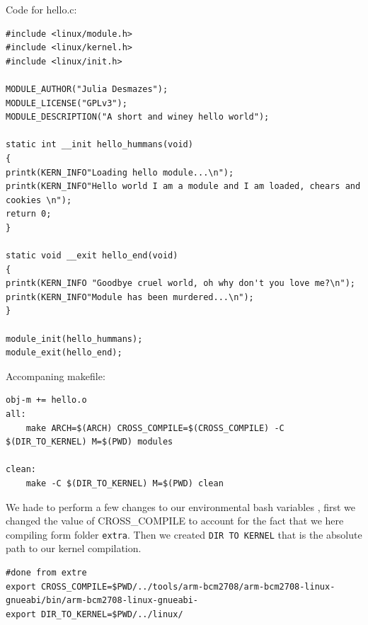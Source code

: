 \documentclass[a4paper,oneside,onecolumn]{article}
\newcommand{\code}[1]{\colorbox{codegray}{\texttt{#1}}}
\begin{document}
Code for hello.c:
\begin{lstlisting}
#include <linux/module.h>       
#include <linux/kernel.h>  
#include <linux/init.h>   

MODULE_AUTHOR("Julia Desmazes");
MODULE_LICENSE("GPLv3");
MODULE_DESCRIPTION("A short and winey hello world");

static int __init hello_hummans(void)
{
printk(KERN_INFO"Loading hello module...\n");
printk(KERN_INFO"Hello world I am a module and I am loaded, chears and cookies \n");
return 0;
}

static void __exit hello_end(void)
{
printk(KERN_INFO "Goodbye cruel world, oh why don't you love me?\n");
printk(KERN_INFO"Module has been murdered...\n");
}

module_init(hello_hummans);
module_exit(hello_end);
\end{lstlisting}
Accompaning makefile:
\begin{lstlisting}
obj-m += hello.o
all:
	make ARCH=$(ARCH) CROSS_COMPILE=$(CROSS_COMPILE) -C $(DIR_TO_KERNEL) M=$(PWD) modules

clean:
	make -C $(DIR_TO_KERNEL) M=$(PWD) clean
\end{lstlisting}
We hade to perform a few changes to our environmental bash variables , first we changed the value of CROSS\_COMPILE to account for the fact that we here compiling form folder \texttt{extra}. Then we created \code{DIR TO KERNEL} that is the absolute path to our kernel compilation.
\begin{lstlisting}
#done from extre
export CROSS_COMPILE=$PWD/../tools/arm-bcm2708/arm-bcm2708-linux-gnueabi/bin/arm-bcm2708-linux-gnueabi-
export DIR_TO_KERNEL=$PWD/../linux/
\end{lstlisting}
\end{document}

